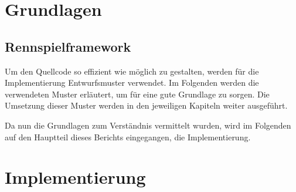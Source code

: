 \documentclass[12pt,a4paper,bibliography=totocnumbered,listof=totocnumbered]{article}
\begin{document}
 



\pagebreak

\section{Grundlagen}


\subsection{Rennspielframework}

















Um den Quellcode so effizient wie möglich zu gestalten, werden für die Implementierung Entwurfsmuster verwendet. Im Folgenden werden die verwendeten Muster erläutert, um für eine gute Grundlage zu sorgen. Die Umsetzung dieser Muster werden in den jeweiligen Kapiteln weiter ausgeführt.






Da nun die Grundlagen zum Verständnis vermittelt wurden, wird im Folgenden auf den Hauptteil dieses Berichts eingegangen, die Implementierung. 
\pagebreak

\section{Implementierung}
\end{document}
